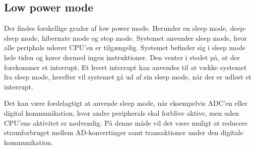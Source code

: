 \subsection{Low power mode}

Der findes forskellige grader af low power mode. Herunder en sleep mode, deep-sleep mode, hibernate mode og stop mode. Systemet anvender sleep mode, hvor alle periphals udover CPU'en er tilgængelig. Systemet befinder sig i sleep mode hele tiden og kører dermed ingen instruktioner. Den venter i stedet på, at der forekommer et interrupt. Et hvert interrupt kan anvendes til at vække systemet fra sleep mode, herefter vil systemet gå ud af sin sleep mode, når der er udløst et interrupt. 

Det kan være fordelagtigt at anvende sleep mode, når eksempelvis ADC'en eller digital kommunikation, hvor andre peripherals skal forblive aktive, men uden CPU'ens aktivitet er nødvendig. På denne måde vil det være muligt at reducere strømforbruget mellem AD-konvertinger samt transaktioner under den digitale kommunikation.\citep{cypresspsoc420152}
